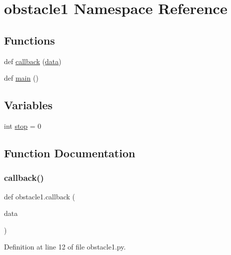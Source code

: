 \hypertarget{namespaceobstacle1}{}\section{obstacle1 Namespace Reference}
\label{namespaceobstacle1}
\subsection*{Functions}
\begin{DoxyCompactItemize}
\item 
def \mbox{\hyperlink{namespaceobstacle1_a44c5d66cfa64267d2d4619d479e38c91}{callback}} (\mbox{\hyperlink{structdata}{data}})
\item 
def \mbox{\hyperlink{namespaceobstacle1_ae0dbbbbce73b1620f228774e60840f7f}{main}} ()
\end{DoxyCompactItemize}
\subsection*{Variables}
\begin{DoxyCompactItemize}
\item 
int \mbox{\hyperlink{namespaceobstacle1_a9e60f290d90669907366c4e7bd4e9449}{stop}} = 0
\end{DoxyCompactItemize}


\subsection{Function Documentation}
\mbox{\label{namespaceobstacle1_a44c5d66cfa64267d2d4619d479e38c91}} 
\subsubsection{\texorpdfstring{callback()}{callback()}}
{\footnotesize\ttfamily def obstacle1.\+callback (\begin{DoxyParamCaption}\item[{}]{data }\end{DoxyParamCaption})}



Definition at line 12 of file obstacle1.\+py.

\mbox{\label{namespaceobstacle1_ae0dbbbbce73b1620f228774e60840f7f}} 
